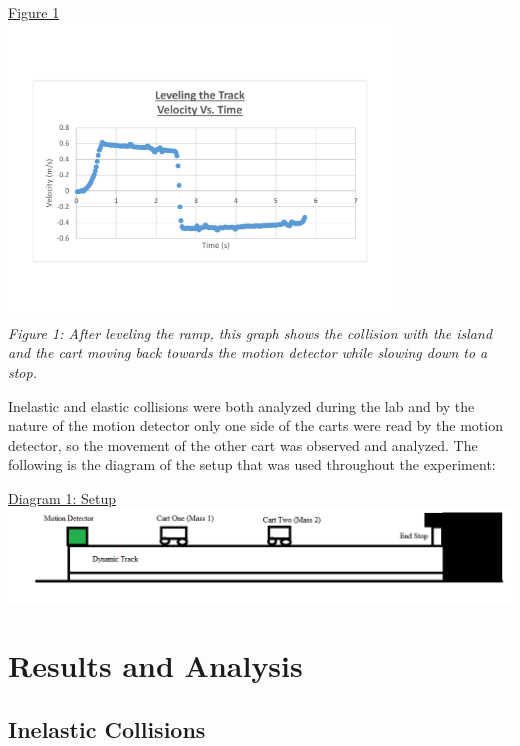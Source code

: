 \documentclass[aps,letterpaper,11pt]{revtex4}
\begin{document}
\newpage

\begin{center}
\underline{Figure 1}\\
\includegraphics[width=4in]{LevelingGraph.pdf}\\
\textit{Figure 1: After leveling the ramp, this graph shows the collision with the island and the cart moving back towards the motion detector while slowing down to a stop.}\\
\end{center}

Inelastic and elastic collisions were both analyzed during the lab and by the nature of the motion detector only one side of the carts were read by the motion detector, so the movement of the other cart was observed and analyzed. The following is the diagram of the setup that was used throughout the experiment:

\begin{center}
\underline{Diagram 1: Setup}
\includegraphics[width=6in]{Setup.png}
\end{center}

\section{Results and Analysis}

\subsection{Inelastic Collisions}
\end{document}
